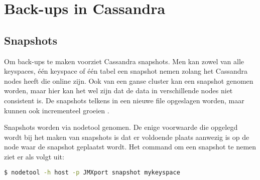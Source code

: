 \chapter{Back-ups in Cassandra}
\label{ch:cassandra_backups}

\section{Snapshots}
Om back-ups te maken voorziet Cassandra snapshots.
Men kan zowel van alle keyspaces, één keyspace of één tabel een snapshot nemen zolang het Cassandra nodes heeft die online zijn.
Ook van een ganse cluster kan een snapshot genomen worden, maar hier kan het wel zijn dat de data in verschillende nodes niet consistent is.
De snapshots telkens in een nieuwe file opgeslagen worden, maar kunnen ook incrementeel groeien \citep{DataStax2016Snapshot}.

Snapshots worden via nodetool genomen.
De enige voorwaarde die opgelegd wordt bij het maken van snapshots is dat er voldoende plaats aanwezig is op de node waar de snapshot geplaatst wordt.
Het command om een snapshot te nemen ziet er als volgt uit:

\begin{lstlisting}[language=Bash, breaklines=true]
$ nodetool -h host -p JMXport snapshot mykeyspace
\end{lstlisting}